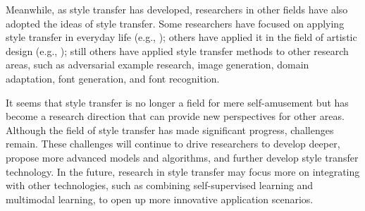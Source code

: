 \documentclass[preprint,12pt]{elsarticle}
\begin{document}
Meanwhile, as style transfer has developed, researchers in other fields have also adopted the ideas of style transfer. Some researchers have focused on applying style transfer in everyday life (e.g., \citep{05ke2023neural,15gunawan2023modernizing}); others have applied it in the field of artistic design (e.g., \citep{10liu2021self,11bae2023unsupervised,12hollein2022stylemesh,13yin20213dstylenet,14yang2022industrial}); still others have applied style transfer methods to other research areas, such as adversarial example research\citep{08liu2021psgan++,09xu2022transeditor}, image generation\citep{19karras2019style}, domain adaptation\citep{20guan2022cdtnet}, font generation\citep{06fu2023neural}, and font recognition\citep{07tang2022few}.

It seems that style transfer is no longer a field for mere self-amusement but has become a research direction that can provide new perspectives for other areas. Although the field of style transfer has made significant progress, challenges remain. These challenges will continue to drive researchers to develop deeper, propose more advanced models and algorithms, and further develop style transfer technology. In the future, research in style transfer may focus more on integrating with other technologies, such as combining self-supervised learning and multimodal learning, to open up more innovative application scenarios.



% 







  
\end{document}
